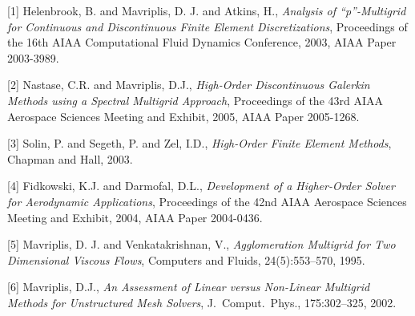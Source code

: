 \documentclass{report}
\begin{document}
[1] Helenbrook, B. and Mavriplis, D. J. and Atkins, H.,
{\em Analysis of
``p''-Multigrid for Continuous and Discontinuous Finite Element
Discretizations}, Proceedings of the 16th AIAA Computational Fluid
Dynamics Conference, 2003, AIAA Paper 2003-3989.

[2] Nastase, C.R. and Mavriplis, D.J.,
{\em High-Order Discontinuous
Galerkin Methods using a Spectral Multigrid Approach}, Proceedings of
the 43rd AIAA Aerospace Sciences Meeting and Exhibit, 2005, AIAA Paper
2005-1268.

[3] Solin, P. and Segeth, P. and Zel, I.D.,
{\em High-Order Finite Element Methods}, Chapman and Hall, 2003.

[4] Fidkowski, K.J. and Darmofal, D.L.,
{\em Development of a
Higher-Order Solver for Aerodynamic Applications}, Proceedings of the
42nd AIAA Aerospace Sciences Meeting and Exhibit, 2004, AIAA Paper
2004-0436.

[5] Mavriplis, D. J. and Venkatakrishnan, V.,
{\em Agglomeration Multigrid for Two Dimensional Viscous Flows},
Computers and Fluids, 24(5):553--570, 1995.

[6] Mavriplis, D.J.,
{\em An Assessment of Linear versus Non-Linear
Multigrid Methods for Unstructured Mesh Solvers},
J.~Comput.~Phys., 175:302--325, 2002. 
\end{document}
